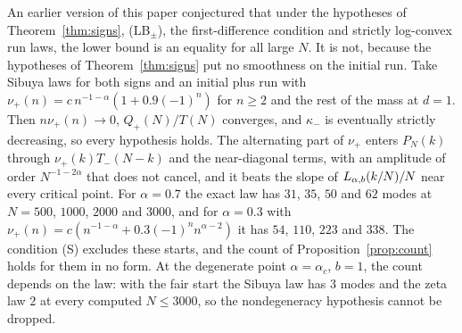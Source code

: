 \ifarxivbuild
\begin{remark}\label{rem:oscillating}
An earlier version of this paper conjectured that under the hypotheses of
Theorem~\ref{thm:signs}, (LB$_\pm$), the first-difference condition and strictly log-convex
run laws, the lower bound is an equality for all large $N$. It is not, because the hypotheses
of Theorem~\ref{thm:signs} put no smoothness on the initial run. Take Sibuya laws for both
signs and an initial plus run with $\nu_\plus(n)=c\,n^{-1-\alpha}(1+0.9(-1)^n)$ for $n\ge2$ and the
rest of the mass at $d=1$. Then $n\nu_\plus(n)\to0$, $Q_\plus(N)/T(N)$ converges, and $\kappa_\minus$
is eventually strictly decreasing, so every hypothesis holds. The alternating part of
$\nu_\plus$ enters $P_N(k)$ through $\nu_\plus(k)T_\minus(N-k)$ and the near-diagonal terms, with
an amplitude of order $N^{-1-2\alpha}$ that does not cancel, and it beats the slope of
$L_{\alpha,b}(k/N)/N$ near every critical point. For $\alpha=0.7$ the exact law has $31$, $35$, $50$ and
$62$ modes at $N=500$, $1000$, $2000$ and $3000$, and for $\alpha=0.3$ with
$\nu_\plus(n)=c(n^{-1-\alpha}+0.3(-1)^nn^{\alpha-2})$ it has $54$, $110$, $223$ and $338$. The
condition (S) excludes these starts, and the count of Proposition~\ref{prop:count} holds
for them in no form. At the degenerate point $\alpha=\alpha_c$, $b=1$, the count depends on the
law: with the fair start the Sibuya law has $3$ modes and the zeta law $2$ at every computed
$N\le3000$, so the nondegeneracy hypothesis cannot be dropped.
\end{remark}
\fi
